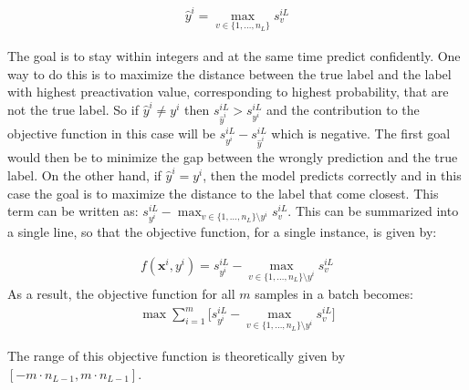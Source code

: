 \begin{align}
    \label{y_hat} \hat{y}^i = \max _{v\in \{1, \ldots, n_L \} } s_v^{iL}
\end{align}

\noindent The goal is to stay within integers and at the same time predict confidently. One way to do this is to maximize the distance between the true label and the label with highest preactivation value, corresponding to highest probability, that are not the true label. So if $\hat{y}^i \neq y^i$ then $s_{\hat{y}^i}^{iL} > s_{y^i}^{iL}$ and the contribution to the objective function in this case will be $s^{iL}_{y^i} - s_{\hat{y}^i}^{iL}$ which is negative. The first goal would then be to minimize the gap between the wrongly prediction and the true label. On the other hand, if $\hat{y}^i = y^i$, then the model predicts correctly and in this case the goal is to maximize the distance to the label that come closest. This term can be written as: $s_{y^i}^{iL} - \max_{v \in \{1, \ldots, n_L\} \setminus y^i } s_v ^{iL}$. This can be summarized into a single line, so that the objective function, for a single instance, is given by: 

\begin{align}
    \label{integer_objective} f(\mathbf{x}^i, y^i) = s_{y ^i} ^{iL} - \max_{v \in \{1, \ldots, n_L\} \setminus y^i } s_v ^{iL}
\end{align}
As a result, the objective function for all $m$ samples in a batch becomes:
\begin{align}
    \label{int} \max \sum_{i=1} ^m \big[ s_{y ^i} ^{iL} - \max_{v \in \{1, \ldots, n_L\} \setminus y^i } s_v ^{iL}  \big]
\end{align}

The range of this objective function is theoretically given by $[-m \cdot n_{L-1}, m \cdot n_{L-1}]$. 

